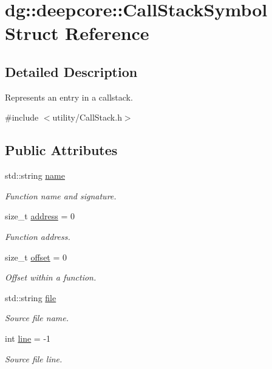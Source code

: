 \hypertarget{structdg_1_1deepcore_1_1_call_stack_symbol}{}\section{dg\+:\+:deepcore\+:\+:Call\+Stack\+Symbol Struct Reference}
\label{structdg_1_1deepcore_1_1_call_stack_symbol}


\subsection{Detailed Description}
Represents an entry in a callstack. 

{\ttfamily \#include $<$utility/\+Call\+Stack.\+h$>$}

\subsection*{Public Attributes}
\begin{DoxyCompactItemize}
\item 
std\+::string \hyperlink{structdg_1_1deepcore_1_1_call_stack_symbol_a6792f8a2df6115a99a1d4fd44c6fafff}{name}
\begin{DoxyCompactList}\small\item\em Function name and signature. \end{DoxyCompactList}\item 
size\+\_\+t \hyperlink{structdg_1_1deepcore_1_1_call_stack_symbol_a017a9b54f804965736f2c5fb4ab57893}{address} = 0
\begin{DoxyCompactList}\small\item\em Function address. \end{DoxyCompactList}\item 
size\+\_\+t \hyperlink{structdg_1_1deepcore_1_1_call_stack_symbol_a47e23cb3fa667d087a9630017cc478ce}{offset} = 0
\begin{DoxyCompactList}\small\item\em Offset within a function. \end{DoxyCompactList}\item 
std\+::string \hyperlink{structdg_1_1deepcore_1_1_call_stack_symbol_a71bdd1fa76748bd2ec9b2259b773a607}{file}
\begin{DoxyCompactList}\small\item\em Source file name. \end{DoxyCompactList}\item 
int \hyperlink{structdg_1_1deepcore_1_1_call_stack_symbol_a3877758a7e10671163f02948abe725d5}{line} = -\/1
\begin{DoxyCompactList}\small\item\em Source file line. \end{DoxyCompactList}\end{DoxyCompactItemize}



